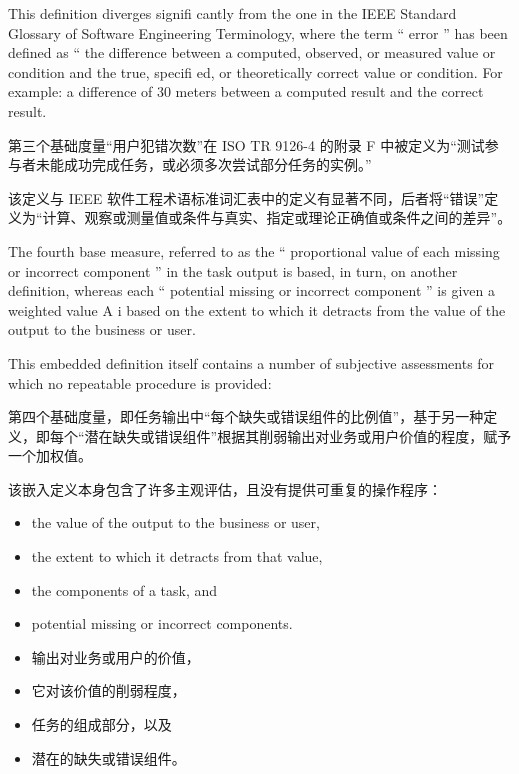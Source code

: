 This definition diverges signifi cantly from the one in the IEEE Standard 
Glossary of Software Engineering Terminology, where the term “ error ” has been 
defined as “ the difference between a computed, observed, or measured value or 
condition and the true, specifi ed, or theoretically correct value or condition. For 
example: a difference of 30 meters between a computed result and the correct 
result.

第三个基础度量“用户犯错次数”在 ISO TR 9126-4 的附录 F 中被定义为“测试参与者未能成功完成任务，或必须多次尝试部分任务的实例。”

该定义与 IEEE 软件工程术语标准词汇表中的定义有显著不同，后者将“错误”定义为“计算、观察或测量值或条件与真实、指定或理论正确值或条件之间的差异”。

The fourth base measure, referred to as the “ proportional value of each 
missing or incorrect component ” in the task output is based, in turn, on another 
definition, whereas each “ potential missing or incorrect component ” is given a 
weighted value A i based on the extent to which it detracts from the value of the 
output to the business or user.

This embedded definition itself contains a number of subjective assessments 
for which no repeatable procedure is provided:


第四个基础度量，即任务输出中“每个缺失或错误组件的比例值”，基于另一种定义，即每个“潜在缺失或错误组件”根据其削弱输出对业务或用户价值的程度，赋予一个加权值。

该嵌入定义本身包含了许多主观评估，且没有提供可重复的操作程序：

\begin{itemize}
 \item the value of the output to the business or user, 
 \item the extent to which it detracts from that value, 
 \item the components of a task, and 
 \item potential missing or incorrect components.
\end{itemize}

\begin{itemize}
\item 输出对业务或用户的价值，
\item 它对该价值的削弱程度，
\item 任务的组成部分，以及
\item 潜在的缺失或错误组件。
\end{itemize}

